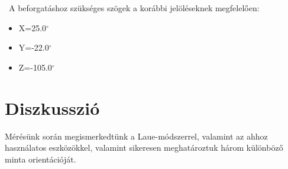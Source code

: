\documentclass[12pt,a4paper]{article}
\begin{document}
\
A beforgatáshoz szükséges szögek a korábbi jelöléseknek megfelelően:
\begin{itemize}
\item{X=25.0$^{\circ}$}
\item{Y=-22.0$^{\circ}$}
\item{Z=-105.0$^{\circ}$}
\end{itemize}

\section{Diszkusszió}
\hspace*{10pt} Mérésünk során megismerkedtünk a Laue-módszerrel, valamint az ahhoz használatos eszközökkel, valamint sikeresen meghatároztuk három különböző minta orientációját.
\end{document}
